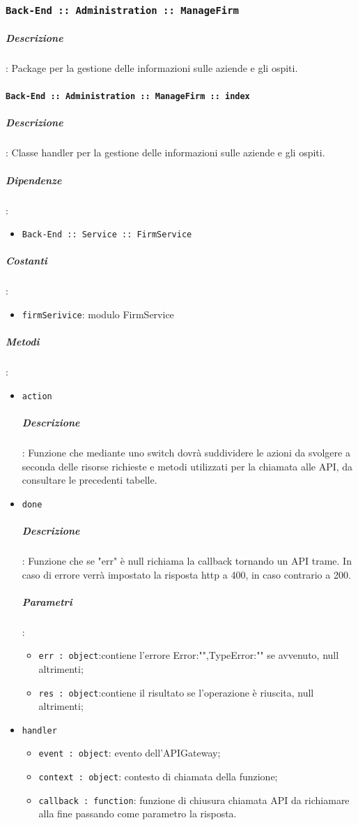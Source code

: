 \documentclass[../DefinizioneDiProdotto_v3.0.0.tex]{subfiles}
\begin{document}
\subsubsection{\texttt{Back-End :: Administration :: ManageFirm}}
\subparagraph{Descrizione}: Package per la gestione delle informazioni sulle aziende e gli ospiti.

\paragraph{\texttt{Back-End :: Administration :: ManageFirm :: index}}
\subparagraph{Descrizione}: Classe handler per la gestione delle informazioni sulle aziende e gli ospiti.
\subparagraph{Dipendenze}:
\begin{itemize}
	\item \texttt{Back-End :: Service :: FirmService}
\end{itemize}
\subparagraph{Costanti}:
\begin{itemize}
	\item \texttt{firmSerivice}: modulo FirmService
\end{itemize}
\subparagraph{Metodi}:
\begin{itemize}
	\item \texttt{action}
	      \subparagraph{Descrizione}: Funzione che mediante uno switch dovrà suddividere le azioni da svolgere a seconda delle risorse richieste e metodi utilizzati per la chiamata alle API, da consultare le precedenti tabelle.
	\item \texttt{done}
	      \subparagraph{Descrizione}: Funzione che se "err" è null richiama la callback tornando un API trame. In caso di errore verrà impostato la risposta http a 400, in caso contrario a 200.
	      \subparagraph{Parametri}:
	      \begin{itemize}
	      	\item \texttt{err : object}:contiene l'errore {Error:"",TypeError:""} se avvenuto, null altrimenti;
	      	\item \texttt{res : object}:contiene il risultato se l'operazione è riuscita, null altrimenti;
	      \end{itemize}
	\item \texttt{handler}
	      \begin{itemize}
	      	\item \texttt{event : object}: evento dell'APIGateway;
	      	\item \texttt{context : object}: contesto di chiamata della funzione;
	      	\item \texttt{callback : function}: funzione di chiusura chiamata API da richiamare alla fine passando come parametro la risposta.
	      \end{itemize}
\end{itemize}
\end{document}
